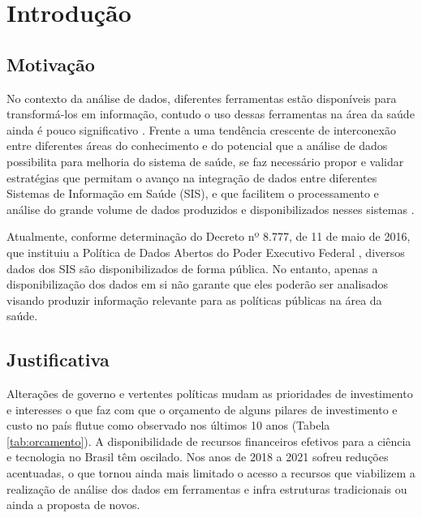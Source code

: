 
\chapter{Introdução}
\label{chap:introducao}

\section{Motivação}
\label{sec:motivacao}

No contexto da análise de dados, diferentes ferramentas estão disponíveis para transformá-los em informação, contudo o uso dessas ferramentas na área da saúde ainda é pouco significativo \cite{galvao_desafios_2019}. Frente a uma tendência crescente de interconexão entre diferentes áreas do conhecimento e do potencial que a análise de dados possibilita para melhoria do sistema de saúde, se faz necessário propor e validar estratégias que permitam o avanço na integração de dados entre diferentes Sistemas de Informação em Saúde (SIS), e que facilitem o processamento e análise do grande volume de dados produzidos e disponibilizados nesses sistemas \cite{galvao_desafios_2019,mehta_concurrence_2018}.

Atualmente, conforme determinação do Decreto nº 8.777, de 11 de maio de 2016, que instituiu a Política de Dados Abertos do Poder Executivo Federal \cite{brasildisponibilidade2016}, diversos dados dos SIS são disponibilizados de forma pública. No entanto, apenas a disponibilização dos dados em si não garante que eles poderão ser analisados visando produzir informação relevante para as políticas públicas na área da saúde.

\section{Justificativa}
\label{sec:justificativa}


Alterações de governo e vertentes políticas mudam as prioridades de investimento e interesses o que faz com que o orçamento de alguns pilares de investimento e custo no país flutue como observado nos últimos 10 anos (Tabela \ref{tab:orcamento}). A disponibilidade de recursos financeiros efetivos para a ciência e tecnologia no Brasil têm oscilado. Nos anos de 2018 a 2021 sofreu reduções acentuadas, o que tornou ainda mais limitado o acesso a recursos que viabilizem a realização de análise dos dados em ferramentas e infra estruturas tradicionais ou ainda a proposta de novos.

